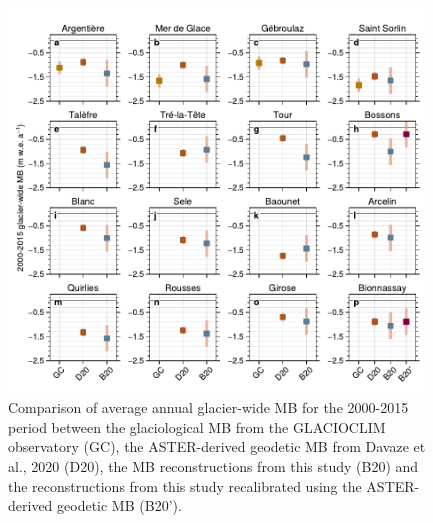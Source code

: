 \begin{figure}[t]
\centering
\includegraphics[width=11cm]{Figures/past/Figure_2.pdf}
\captionsetup{justification=centering}
\caption{Comparison of average annual glacier-wide MB for the 2000-2015 period between the glaciological MB from the GLACIOCLIM observatory (GC), the ASTER-derived geodetic MB from Davaze et al., 2020 (D20), the MB reconstructions from this study (B20) and the reconstructions from this study recalibrated using the ASTER-derived geodetic MB (B20').}
\label{past:fig2}
\end{figure}

